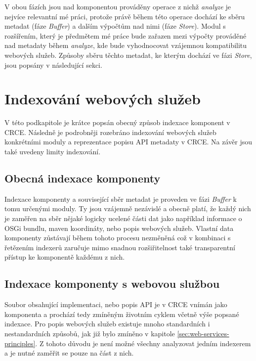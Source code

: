 \documentclass[czech,DP]{thesiskiv}
\begin{document}
V obou fázích jsou nad komponentou prováděny operace z nichž \textit{analyze} je nejvíce relevantní mé práci, protože právě během této operace dochází ke sběru metadat (fáze \textit{Buffer}) a dalším výpočtům nad nimi (fáze \textit{Store}). Modul s rozšířením, který je předmětem mé práce bude zařazen mezi výpočty prováděné nad metadaty během \textit{analyze}, kde bude vyhodnocovat vzájemnou kompatibilitu webových služeb. Způsoby sběru těchto metadat, ke kterým dochází ve fázi \textit{Store}, jsou popsány v následující sekci. 

%
%
%
%
%
%
%

\section{Indexování webových služeb}
\label{sec:api-index}

V této podkapitole je krátce popsán obecný způsob indexace komponent v CRCE. Následně je podrobněji rozebráno indexování webových služeb konkrétními moduly a reprezentace popisu API metadaty v CRCE. Na závěr jsou také uvedeny limity indexování.


\subsection{Obecná indexace komponenty}

Indexace komponenty a související sběr metadat je proveden ve fázi \textit{Buffer} k tomu určenými moduly. Ty jsou vzájemně nezávislé a obecně platí, že každý nich je zaměřen na sběr nějaké logicky ucelené části dat jako například informace o OSGi bundlu, maven koordináty, nebo popis webových služeb. Vlastní data komponenty zůstávají během tohoto procesu nezměněná což v kombinaci s řetězením indexerů zaručuje mimo snadnou rozšiřitelnost také transparentní přístup ke komponentě každému z nich. 

\subsection{Indexace komponenty s webovou službou}

Soubor obsahující implementaci, nebo popis API je v CRCE vnímán jako komponenta a prochází tedy zmíněným životním cyklem včetně výše popsané indexace. Pro popis webových služeb existuje mnoho standardních i nestandardních způsobů, jak již bylo zmíněno v kapitole \ref{sec:web-services-principles}. Z tohoto důvodu je není možné všechny analyzovat jedním indexerem a je nutné zaměřit se pouze na část z nich. 
\end{document}
